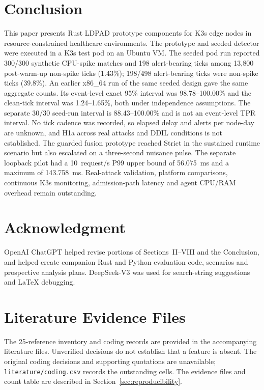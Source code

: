\documentclass{ieeeaccess}
\begin{document}
\section{Conclusion}
\label{sec:conclusion}

This paper presents Rust LDPAD prototype components for K3s edge nodes in resource-constrained healthcare environments. The prototype and seeded detector were executed in a K3s test pod on an Ubuntu VM. The seeded pod run reported 300/300 synthetic CPU-spike matches and 198 alert-bearing ticks among 13,800 post-warm-up non-spike ticks (1.43\%); 198/498 alert-bearing ticks were non-spike ticks (39.8\%). An earlier x86\_64 run of the same seeded design gave the same aggregate counts. Its event-level exact 95\% interval was 98.78--100.00\% and the clean-tick interval was 1.24--1.65\%, both under independence assumptions. The separate 30/30 seed-run interval is 88.43--100.00\% and is not an event-level TPR interval. No tick cadence was recorded, so elapsed delay and alerts per node-day are unknown, and H1a across real attacks and DDIL conditions is not established. The guarded fusion prototype reached Strict in the sustained runtime scenario but also escalated on a three-second nuisance pulse. The separate loopback pilot had a 10~request/s P99 upper bound of 56.075~ms and a maximum of 143.758~ms. Real-attack validation, platform comparisons, continuous K3s monitoring, admission-path latency and agent CPU/RAM overhead remain outstanding.

\section*{Acknowledgment}

OpenAI ChatGPT helped revise portions of Sections~II--VIII and the Conclusion, and helped create companion Rust and Python evaluation code, scenarios and prospective analysis plans. DeepSeek-V3 was used for search-string suggestions and LaTeX debugging.

\appendices

\section{Literature Evidence Files}
\label{app:litmatrix}

The 25-reference inventory and coding records are provided in the accompanying literature files. Unverified decisions do not establish that a feature is absent. The original coding decisions and supporting quotations are unavailable; \texttt{literature/coding.csv} records the outstanding cells. The evidence files and count table are described in Section~\ref{sec:reproducibility}.
\end{document}
